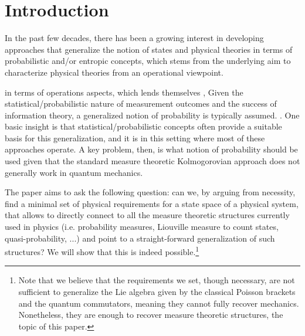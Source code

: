 \documentclass[10pt,twocolumn, nofootinbib]{revtex4-2}
\begin{document}
\section{Introduction}

In the past few decades, there has been a growing interest in developing approaches that generalize the notion of states and physical theories in terms of probabilistic and/or entropic concepts, which stems from the underlying aim to characterize physical theories from an operational viewpoint. 

in terms of operations aspects, which lends themselves ,  Given the statistical/probabilistic nature of measurement outcomes and the success of information theory, a generalized notion of probability is typically assumed. . One basic insight is that statistical/probabilistic concepts often provide a suitable basis for this generalization, and it is in this setting where most of these approaches operate. A key problem, then, is what notion of probability should be used given that the standard measure theoretic Kolmogorovian approach does not generally work in quantum mechanics.

The paper aims to ask the following question: can we, by arguing from necessity, find a minimal set of physical requirements for a state space of a physical system, that allows to directly connect to all the measure theoretic structures currently used in physics (i.e. probability measures, Liouville measure to count states, quasi-probability, ...) and point to a straight-forward generalization of such structures? We will show that this is indeed possible.\footnote{Note that we believe that the requirements we set, though necessary, are not sufficient to generalize the Lie algebra given by the classical Poisson brackets and the quantum commutators, meaning they cannot fully recover mechanics. Nonetheless, they are enough to recover measure theoretic structures, the topic of this paper.}
\end{document}
